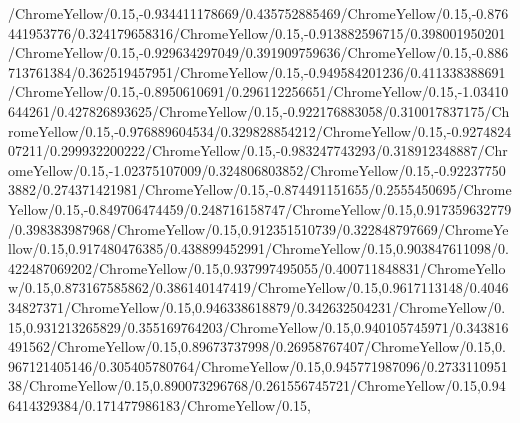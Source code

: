 {\begin{tikzternal}
{/ChromeYellow/0.15,-0.934411178669/0.435752885469/ChromeYellow/0.15,-0.876441953776/0.324179658316/ChromeYellow/0.15,-0.913882596715/0.398001950201/ChromeYellow/0.15,-0.929634297049/0.391909759636/ChromeYellow/0.15,-0.886713761384/0.362519457951/ChromeYellow/0.15,-0.949584201236/0.411338388691/ChromeYellow/0.15,-0.8950610691/0.296112256651/ChromeYellow/0.15,-1.03410644261/0.427826893625/ChromeYellow/0.15,-0.922176883058/0.310017837175/ChromeYellow/0.15,-0.976889604534/0.329828854212/ChromeYellow/0.15,-0.927482407211/0.299932200222/ChromeYellow/0.15,-0.983247743293/0.318912348887/ChromeYellow/0.15,-1.02375107009/0.324806803852/ChromeYellow/0.15,-0.922377503882/0.274371421981/ChromeYellow/0.15,-0.874491151655/0.2555450695/ChromeYellow/0.15,-0.849706474459/0.248716158747/ChromeYellow/0.15,0.917359632779/0.398383987968/ChromeYellow/0.15,0.912351510739/0.322848797669/ChromeYellow/0.15,0.917480476385/0.438899452991/ChromeYellow/0.15,0.903847611098/0.422487069202/ChromeYellow/0.15,0.937997495055/0.400711848831/ChromeYellow/0.15,0.873167585862/0.386140147419/ChromeYellow/0.15,0.9617113148/0.404634827371/ChromeYellow/0.15,0.946338618879/0.342632504231/ChromeYellow/0.15,0.931213265829/0.355169764203/ChromeYellow/0.15,0.940105745971/0.343816491562/ChromeYellow/0.15,0.89673737998/0.26958767407/ChromeYellow/0.15,0.967121405146/0.305405780764/ChromeYellow/0.15,0.945771987096/0.273311095138/ChromeYellow/0.15,0.890073296768/0.261556745721/ChromeYellow/0.15,0.946414329384/0.171477986183/ChromeYellow/0.15,
}
\end{tikzternal}}

